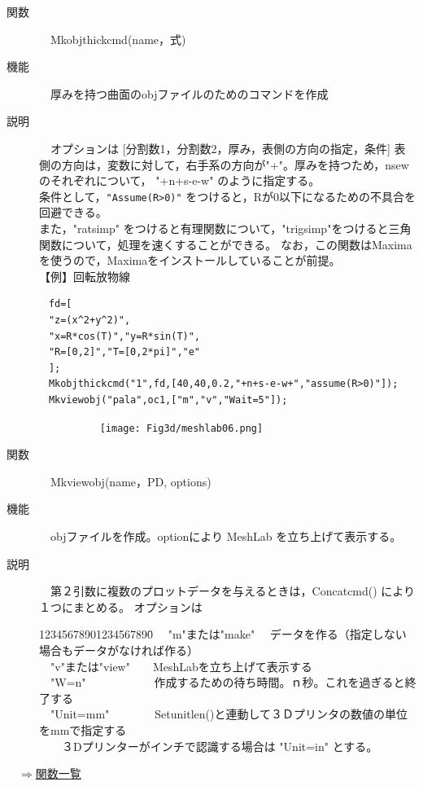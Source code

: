 \documentclass[papersize,a4paper,12pt,uplatex]{jsarticle}
\begin{document}
\begin{description}
\hypertarget{mkobjthickcmd}{}
\item[関数]　Mkobjthickcmd(name，式)
\item[機能]　厚みを持つ曲面のobjファイルのためのコマンドを作成
\item[説明]　オプションは [分割数1，分割数2，厚み，表側の方向の指定，条件]
表側の方向は，変数に対して，右手系の方向が"+"。厚みを持つため，nsew のそれぞれについて，
"+n+s-e-w" のように指定する。\\
条件として，\verb|"Assume(R>0)"| をつけると，Rが0以下になるための不具合を回避できる。\\
また，"ratsimp" をつけると有理関数について，"trigsimp"をつけると三角関数について，処理を速くすることができる。
なお，この関数はMaximaを使うので，Maximaをインストールしていることが前提。\\
【例】回転放物線
\begin{verbatim}
　fd=[
　"z=(x^2+y^2)",
　"x=R*cos(T)","y=R*sin(T)",
　"R=[0,2]","T=[0,2*pi]","e"
　];
　Mkobjthickcmd("1",fd,[40,40,0.2,"+n+s-e-w+","assume(R>0)"]);
　Mkviewobj("pala",oc1,["m","v","Wait=5"]); 
\end{verbatim}
　　　　  　\texttt{[image: Fig3d/meshlab06.png]}\\

\hypertarget{mkviewobj}{}
\item[関数]　Mkviewobj(name，PD, options)
\item[機能]　objファイルを作成。optionにより MeshLab を立ち上げて表示する。
\item[説明]　第２引数に複数のプロットデータを与えるときは，Concatcmd() により１つにまとめる。
オプションは 
\begin{tabbing}
12345678901234567890\=\kill
　"m"または"make"　\> データを作る（指定しない場合もデータがなければ作る）\\
　"v"または"view"　　\>MeshLabを立ち上げて表示する\\
　"W=n"　　　　　　\>作成するための待ち時間。ｎ秒。これを過ぎると終了する\\
　"Unit=mm"　　　　\>Setunitlen()と連動して３Ｄプリンタの数値の単位をmmで指定する\\
　　\>３Dプリンターがインチで認識する場合は "Unit=in" とする。\\
\end{tabbing}


\end{description}
\begin{flushright}　\hyperlink{functionlist}{$\Rightarrow$関数一覧}\end{flushright}
\end{document}
